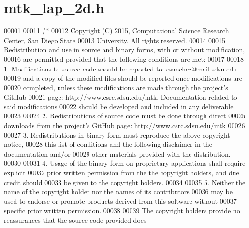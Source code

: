 \hypertarget{mtk__lap__2d_8h_source}{\section{mtk\+\_\+lap\+\_\+2d.\+h}
\label{mtk__lap__2d_8h_source}
}

\begin{DoxyCode}
00001 
00011 \textcolor{comment}{/*}
00012 \textcolor{comment}{Copyright (C) 2015, Computational Science Research Center, San Diego State}
00013 \textcolor{comment}{University. All rights reserved.}
00014 \textcolor{comment}{}
00015 \textcolor{comment}{Redistribution and use in source and binary forms, with or without modification,}
00016 \textcolor{comment}{are permitted provided that the following conditions are met:}
00017 \textcolor{comment}{}
00018 \textcolor{comment}{1. Modifications to source code should be reported to: esanchez@mail.sdsu.edu}
00019 \textcolor{comment}{and a copy of the modified files should be reported once modifications are}
00020 \textcolor{comment}{completed, unless these modifications are made through the project's GitHub}
00021 \textcolor{comment}{page: http://www.csrc.sdsu.edu/mtk. Documentation related to said modifications}
00022 \textcolor{comment}{should be developed and included in any deliverable.}
00023 \textcolor{comment}{}
00024 \textcolor{comment}{2. Redistributions of source code must be done through direct}
00025 \textcolor{comment}{downloads from the project's GitHub page: http://www.csrc.sdsu.edu/mtk}
00026 \textcolor{comment}{}
00027 \textcolor{comment}{3. Redistributions in binary form must reproduce the above copyright notice,}
00028 \textcolor{comment}{this list of conditions and the following disclaimer in the documentation and/or}
00029 \textcolor{comment}{other materials provided with the distribution.}
00030 \textcolor{comment}{}
00031 \textcolor{comment}{4. Usage of the binary form on proprietary applications shall require explicit}
00032 \textcolor{comment}{prior written permission from the the copyright holders, and due credit should}
00033 \textcolor{comment}{be given to the copyright holders.}
00034 \textcolor{comment}{}
00035 \textcolor{comment}{5. Neither the name of the copyright holder nor the names of its contributors}
00036 \textcolor{comment}{may be used to endorse or promote products derived from this software without}
00037 \textcolor{comment}{specific prior written permission.}
00038 \textcolor{comment}{}
00039 \textcolor{comment}{The copyright holders provide no reassurances that the source code provided does}

\end{DoxyCode}
